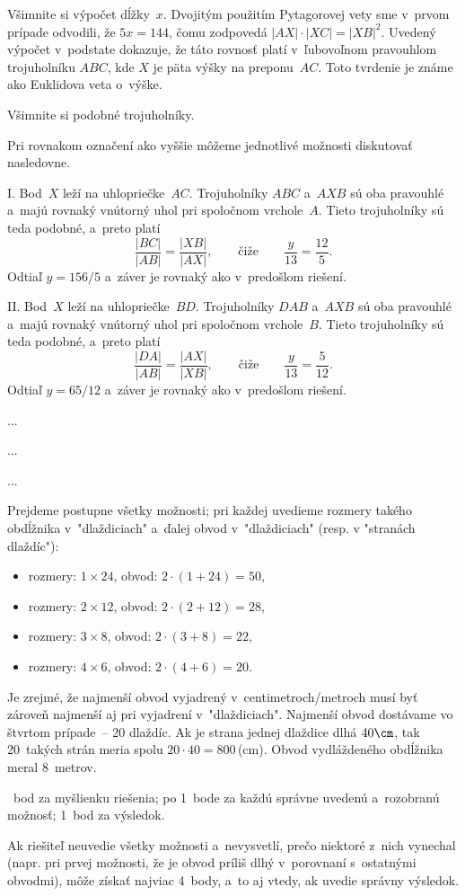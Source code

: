 {\poznamka
Všimnite si výpočet dĺžky~$x$.
Dvojitým použitím Pytagorovej vety sme v~prvom prípade odvodili, že
$5x=144$, čomu zodpovedá $|AX|\cdot|XC|=|XB|^2$.
Uvedený výpočet v~podstate dokazuje, že táto rovnosť platí v~ľubovoľnom
pravouhlom trojuholníku $ABC$, kde $X$ je päta výšky na preponu~$AC$.
Toto tvrdenie je známe ako Euklidova veta o~výške.

\inynapad
Všimnite si podobné trojuholníky.

\ineriesenie
Pri rovnakom označení ako vyššie môžeme jednotlivé možnosti diskutovať
nasledovne.

\smallskip
I.
Bod~$X$ leží na uhlopriečke~$AC$.
Trojuholníky $ABC$ a~$AXB$ sú oba pravouhlé a~majú rovnaký vnútorný uhol pri spoločnom vrchole~$A$.
Tieto trojuholníky sú teda podobné, a~preto platí
$$
\frac{|BC|}{|AB|}=\frac{|XB|}{|AX|},
\qquad\text{čiže}\qquad
\frac{y}{13}=\frac{12}{5}.
$$
Odtiaľ $y=156/5$ a~záver je rovnaký ako v~predošlom riešení.

\smallskip
II.
Bod~$X$ leží na uhlopriečke~$BD$.
Trojuholníky $DAB$ a~$AXB$ sú oba pravouhlé a~majú rovnaký vnútorný uhol pri spoločnom vrchole~$B$.
Tieto trojuholníky sú teda podobné, a~preto platí
$$
\frac{|DA|}{|AB|}=\frac{|AX|}{|XB|},
\qquad\text{čiže}\qquad
\frac{y}{13}=\frac{5}{12}.
$$
Odtiaľ $y=65/12$ a~záver je rovnaký ako v~predošlom riešení.
}

{%
...}

{%
...}

{%
...}

{%
Prejdeme postupne všetky možnosti; pri každej uvedieme rozmery takého
obdĺžnika v~"dlaždiciach" a~ďalej obvod v~"dlaždiciach" (resp. v "stranách
dlaždíc"):
\begin{itemize}
  \item rozmery: $1\times 24$, obvod: $2\cdot(1+24)=50$,
  \item rozmery: $2\times 12$, obvod: $2\cdot(2+12)=28$,
  \item rozmery: $3\times 8$, obvod: $2\cdot(3+8)=22$,
  \item rozmery: $4\times 6$, obvod: $2\cdot(4+6)=20$.
\end{itemize}
Je zrejmé, že najmenší obvod vyjadrený v~centimetroch/metroch musí byť
zároveň najmenší aj pri vyjadrení v~"dlaždiciach".
Najmenší obvod dostávame vo štvrtom prípade~-- 20 dlaždíc.
Ak je strana jednej dlaždice dlhá $40\cm$, tak 20~takých strán meria
spolu $20\cdot40=800$\,(cm).
Obvod vydláždeného obdĺžnika meral 8~metrov.

~bod za myšlienku riešenia;
po 1~bode za každú správne uvedenú a~rozobranú možnosť;
1~bod za výsledok.

Ak riešiteľ neuvedie všetky možnosti a~nevysvetlí, prečo niektoré z~nich
vynechal (napr. pri prvej možnosti, že je obvod príliš dlhý v~porovnaní
s~ostatnými obvodmi), môže získať najviac 4~body, a~to aj vtedy, ak uvedie
správny výsledok.
\endhodnotenie
}

